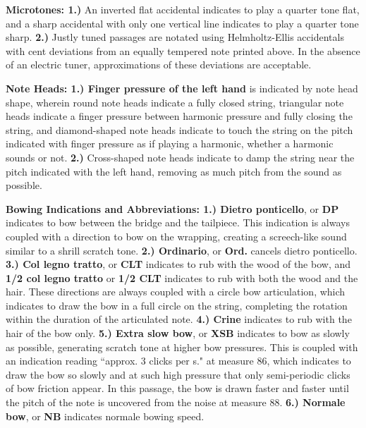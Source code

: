 \documentclass[10pt]{article}
\begin{document}
\begingroup
\textbf{Microtones: 1.)} An inverted flat accidental indicates to play a quarter tone flat, and a sharp accidental with only one vertical line indicates to play a quarter tone sharp. \textbf{2.)} Justly tuned passages are notated using Helmholtz-Ellis accidentals with cent deviations from an equally tempered note printed above. In the absence of an electric tuner, approximations of these deviations are acceptable. \\
\endgroup

\begingroup
\textbf{Note Heads: 1.) Finger pressure of the left hand} is indicated by note head shape, wherein round note heads indicate a fully closed string, triangular note heads indicate a finger pressure between harmonic pressure and fully closing the string, and diamond-shaped note heads indicate to touch the string on the pitch indicated with finger pressure as if playing a harmonic, whether a harmonic sounds or not. \textbf{2.)} Cross-shaped note heads indicate to damp the string near the pitch indicated with the left hand, removing as much pitch from the sound as possible. \\
\endgroup

\begingroup
\textbf{Bowing Indications and Abbreviations: 1.) Dietro ponticello}, or \textbf{DP} indicates to bow between the bridge and the tailpiece. This indication is always coupled with a direction to bow on the wrapping, creating a screech-like sound similar to a shrill scratch tone. \textbf{2.) Ordinario}, or \textbf{Ord.} cancels dietro ponticello. \textbf{3.) Col legno tratto}, or \textbf{CLT} indicates to rub with the wood of the bow, and \textbf{1/2 col legno tratto} or \textbf{1/2 CLT} indicates to rub with both the wood and the hair. These directions are always coupled with a circle bow articulation, which indicates to draw the bow in a full circle on the string, completing the rotation within the duration of the articulated note. \textbf{4.) Crine} indicates to rub with the hair of the bow only. \textbf{5.) Extra slow bow}, or \textbf{XSB} indicates to bow as slowly as possible, generating scratch tone at higher bow pressures. This is coupled with an indication reading ``approx. 3 clicks per s." at measure 86, which indicates to draw the bow so slowly and at such high pressure that only semi-periodic clicks of bow friction appear. In this passage, the bow is drawn faster and faster until the pitch of the note is uncovered from the noise at measure 88. \textbf{6.) Normale bow}, or \textbf{NB} indicates normale bowing speed.  \\
\endgroup
\end{document}
